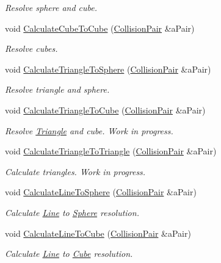 \begin{DoxyCompactItemize}
\begin{DoxyCompactList}\small\item\em Resolve sphere and cube. \end{DoxyCompactList}\item 
void \hyperlink{classResolver_a2005d8985466135c49db98076d80b05b}{Calculate\+Cube\+To\+Cube} (\hyperlink{structCollisionPair}{Collision\+Pair} \&a\+Pair)
\begin{DoxyCompactList}\small\item\em Resolve cubes. \end{DoxyCompactList}\item 
void \hyperlink{classResolver_af8db9e30bdd401ed6a2c85bbf18af611}{Calculate\+Triangle\+To\+Sphere} (\hyperlink{structCollisionPair}{Collision\+Pair} \&a\+Pair)
\begin{DoxyCompactList}\small\item\em Resolve triangle and sphere. \end{DoxyCompactList}\item 
void \hyperlink{classResolver_aa6d0177ef6e33fe532c166ff0bd66cff}{Calculate\+Triangle\+To\+Cube} (\hyperlink{structCollisionPair}{Collision\+Pair} \&a\+Pair)
\begin{DoxyCompactList}\small\item\em Resolve \hyperlink{structTriangle}{Triangle} and cube. Work in progress. \end{DoxyCompactList}\item 
void \hyperlink{classResolver_ab28f2ae93d8d24019234227f85f859ce}{Calculate\+Triangle\+To\+Triangle} (\hyperlink{structCollisionPair}{Collision\+Pair} \&a\+Pair)
\begin{DoxyCompactList}\small\item\em Calculate triangles. Work in progress. \end{DoxyCompactList}\item 
void \hyperlink{classResolver_a22bbe9fc95bb2bcd34f3c9f8414473ca}{Calculate\+Line\+To\+Sphere} (\hyperlink{structCollisionPair}{Collision\+Pair} \&a\+Pair)
\begin{DoxyCompactList}\small\item\em Calculate \hyperlink{structLine}{Line} to \hyperlink{structSphere}{Sphere} resolution. \end{DoxyCompactList}\item 
void \hyperlink{classResolver_a0a63e895e92ceb64391a5ef0c065634e}{Calculate\+Line\+To\+Cube} (\hyperlink{structCollisionPair}{Collision\+Pair} \&a\+Pair)
\begin{DoxyCompactList}\small\item\em Calculate \hyperlink{structLine}{Line} to \hyperlink{structCube}{Cube} resolution. \end{DoxyCompactList}\item 

\end{DoxyCompactItemize}
